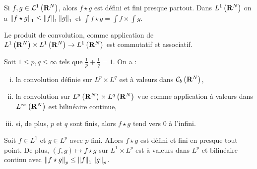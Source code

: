 \begin{thm}
	Si $f,g \in \mathcal{L}^1 \left( \mathbf{R}^N \right)$, alors $f \star g$ est défini et fini presque partout.
	Dans $L^1 \left( \mathbf{R}^N \right)$ on a $\left\lVert f \star g\right\rVert_1 \leq \left\lVert f\right\rVert_1 \left\lVert g\right\rVert_1$ et $\int f \star g = \int f \times \int g$.
\end{thm}

\begin{thm}
	Le produit de convolution, comme application de $L^1 \left( \mathbf{R}^N \right) \times L^1 \left( \mathbf{R}^N \right) \to L^1 \left( \mathbf{R}^N \right)$ est commutatif et associatif.
\end{thm}

\begin{thm}
	Soit $1 \leq p,q \leq \infty$ tels que $\frac{1}{p} + \frac{1}{q} = 1$. On a :
	\begin{enumerate}[(i)]
		\item la convolution définie sur $L^p \times L^q$ est à valeurs dans $\mathcal{C}_b \left( \mathbf{R}^N \right)$,
		\item la convolution sur $L^p \left( \mathbf{R}^N \right) \times L^q \left( \mathbf{R}^N \right)$ vue comme application à valeurs dans $L^\infty \left( \mathbf{R}^N \right)$ est bilinéaire continue,
		\item si, de plus, $p$ et $q$ sont finis, alors $f \star g$ tend vers $0$ à l'infini.
	\end{enumerate}
\end{thm}

\begin{thm}
	Soit $f \in L^1$ et $g \in L^p$ avec $p$ fini.
	ALors $f \star g$ est défini et fini en presque tout point.
	De plus, $(f,g) \mapsto f \star g$ sur $L^1 \times L^p$ est à valeurs dans $L^p$ et bilinéaire continu avec $\left\lVert f \star g\right\rVert_p \leq \left\lVert f\right\rVert_1 \left\lVert g\right\rVert_p$.
\end{thm} 
